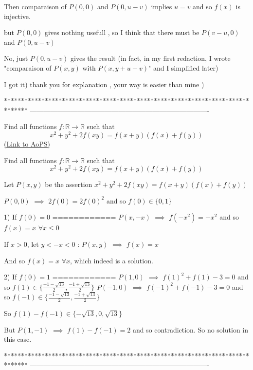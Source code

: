 \begin{solution}
	\begin{tcolorbox}Then comparaison of $P(0,0)$ and $P(0,u-v)$ implies $u=v$ and so $f(x)$ is injective.

but $P(0,0)$ gives nothing usefull , so I think that there must be $P(v-u,0)$ and $P(0,u-v)$\end{tcolorbox}
No, just $P(0,u-v)$ gives the result
(in fact, in my first redaction, I wrote "comparaison of $P(x,y)$ with $P(x,y+u-v)$" and I simplified later)
\end{solution}



\begin{solution}
	I got it) thank you for explanation , your way is easier than mine )
\end{solution}
*******************************************************************************
-------------------------------------------------------------------------------

\begin{problem}
	Find all functions $f:\mathbb{R} \to \mathbb{R}$ such that \[x^2+y^2+2f(xy)=f(x+y)(f(x)+f(y))\]
	\flushright \href{https://artofproblemsolving.com/community/c6h568166}{(Link to AoPS)}
\end{problem}



\begin{solution}
	\begin{tcolorbox}Find all functions $f:\mathbb{R} \to \mathbb{R}$ such that \[x^2+y^2+2f(xy)=f(x+y)(f(x)+f(y))\]\end{tcolorbox}
Let $P(x,y)$ be the assertion $x^2+y^2+2f(xy)=f(x+y)(f(x)+f(y))$

$P(0,0)$ $\implies$ $2f(0)=2f(0)^2$ and so $f(0)\in\{0,1\}$

1) If $f(0)=0$
============
$P(x,-x)$ $\implies$ $f(-x^2)=-x^2$ and so $f(x)=x$ $\forall x\le 0$

If $x>0$, let $y<-x<0$ : $P(x,y)$ $\implies$ $f(x)=x$

And so $\boxed{f(x)=x}$ $\forall x$, which indeed is a solution.

2) If $f(0)=1$
============
$P(1,0)$ $\implies$ $f(1)^2+f(1)-3=0$ and so $f(1)\in\{\frac{-1-\sqrt{13}}2,\frac{-1+\sqrt{13}}2\}$
$P(-1,0)$ $\implies$ $f(-1)^2+f(-1)-3=0$ and so $f(-1)\in\{\frac{-1-\sqrt{13}}2,\frac{-1+\sqrt{13}}2\}$

So $f(1)-f(-1)\in\{-\sqrt{13},0,\sqrt{13}\}$

But $P(1,-1)$ $\implies$ $f(1)-f(-1)=2$ and so contradiction.
So no solution in this case.
\end{solution}
*******************************************************************************
-------------------------------------------------------------------------------


